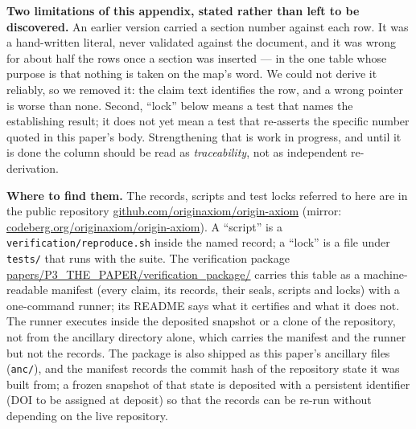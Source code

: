 \documentclass[11pt,a4paper]{article}
\theoremstyle{definition}
\theoremstyle{remark}
\begin{document}
\smallskip
\noindent\textbf{Two limitations of this appendix, stated rather than left to be discovered.}
An earlier version carried a section number against each row. It was a hand-written literal, never
validated against the document, and it was wrong for about half the rows once a section was
inserted --- in the one table whose purpose is that nothing is taken on the map's word. We could not
derive it reliably, so we removed it: the claim text identifies the row, and a wrong pointer is
worse than none. Second, ``lock'' below means a test that names the establishing result; it does not
yet mean a test that re-asserts the specific number quoted in this paper's body. Strengthening that
is work in progress, and until it is done the column should be read as \emph{traceability}, not as
independent re-derivation.

\smallskip
\noindent\textbf{Where to find them.} The records, scripts and test locks referred to here are in
the public repository \url{github.com/originaxiom/origin-axiom} (mirror:
\url{codeberg.org/originaxiom/origin-axiom}). A ``script'' is a \texttt{verification/reproduce.sh}
inside the named record; a ``lock'' is a file under \texttt{tests/} that runs with the suite. The
verification package \url{papers/P3_THE_PAPER/verification_package/} carries this table as a machine-readable
manifest (every claim, its records, their seals, scripts and locks) with a one-command runner; its README says
what it certifies and what it does not. The runner executes inside the deposited snapshot or a clone of the repository,
not from the ancillary directory alone, which carries the manifest and the runner but not the records. The package is also shipped as this paper's ancillary files
(\texttt{anc/}), and the manifest records the commit hash of the repository state it was built from; a frozen
snapshot of that state is deposited with a persistent identifier (DOI to be assigned at deposit) so that the
records can be re-run without depending on the live repository.
\end{document}
